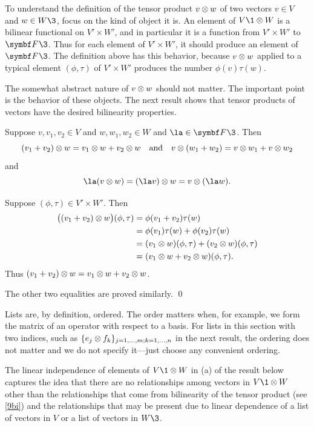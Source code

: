 To understand the definition of the tensor product $v \tensor w$ of two vectors $v \in V$ and $w \in W\3$, focus on the kind of object it is. An element of $V\1 \tensor W$ is a bilinear functional on $V'\! \times W'\!$, and in particular it is a function from $V'\! \times W'$ to $\F{}\3$. Thus for each element of $V'\! \times W'\!$, it should produce an element of $\F{}\3$. The definition above has this behavior, because $v \tensor w$ applied to a typical element $(\phi, \tau)$ of $V'\! \times W'$ produces the number $\phi(v) \tau(w)$.

The somewhat abstract nature of $v \tensor w$ should not matter. The important point is the behavior of these objects. The next result shows that tensor products of vectors have the desired bilinearity properties.

{Suppose $v, v_1, v_2 \in V$ and $w, w_1, w_2 \in W$ and $\la \in \F{}\3$. Then
\[
(v_1 + v_2) \tensor w = v_1 \tensor w + v_2 \tensor w
\andd
v \tensor (w_1 + w_2) = v \tensor w_1 + v \tensor w_2
\]
and
\[
\la(v \tensor w) = (\la v) \tensor w = v \tensor (\la w).
\]}

\proof
Suppose $(\phi, \tau) \in V'\! \times W'\!$. Then
\begin{align*}
\paren[\big]{ (v_1 + v_2) \tensor w }(\phi, \tau) &= \phi( v_1 + v_2) \tau(w)\\
&= \phi(v_1) \tau(w) + \phi(v_2) \tau(w) \\
&= (v_1 \tensor w)(\phi, \tau) + (v_2 \tensor w)(\phi, \tau)\\
&= (v_1 \tensor w + v_2 \tensor w)(\phi, \tau).
\end{align*}
Thus $(v_1 + v_2) \tensor w = v_1 \tensor w + v_2 \tensor w$.

The other two equalities are proved similarly.
\qed

\pagebreak[3]

Lists are, by definition, ordered. The order matters when, for example, we form the matrix of an operator with respect to a basis. For lists in this section with two indices, such as $\br{e_j \tensor f_k}_{j = 1, \ldots, m; k = 1, \ldots, n}$ in the next result,  the ordering does not matter and we do not specify it---just choose any convenient ordering.

The linear independence of elements of $V\1 \tensor W$ in (a) of the result below captures the idea that there are no relationships among vectors in $V\1 \tensor W$ other than the relationships that come from bilinearity of the tensor product (see \ref{9bi}) and the relationships that may be present due to linear dependence of a list of vectors in $V$ or a list of vectors in $W\3$.

